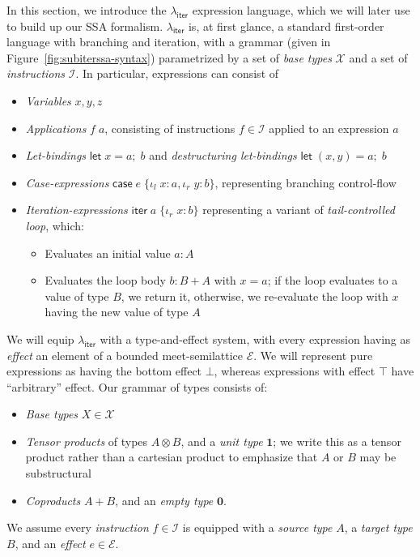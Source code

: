 \documentclass[acmsmall,screen,review]{acmart}
\newcommand{\mc}[1]{\ensuremath{\mathcal{#1}}}
\newcommand{\mb}[1]{\ensuremath{\mathbf{#1}}}
\newcommand{\ms}[1]{\ensuremath{\mathsf{#1}}}
\newcommand{\lto}{:}
\newcommand{\linl}[1]{\iota_l\;{#1}}
\newcommand{\linr}[1]{\iota_r\;{#1}}
\newcommand{\letexpr}[3]{\ensuremath{\ms{let}\;#1 = #2;\;#3}}
\newcommand{\caseexpr}[5]{\ms{case}\;#1\;\{\linl{#2} \lto #3, \linr{#4} \lto #5\}}
\newcommand{\liter}[3]{\ms{iter}\;#1\;\{ \linr{#2} \lto #3 \}}
\newcommand{\subiterssa}{\(\lambda_{\ms{iter}}\)}
\begin{document}
In this section, we introduce the \subiterssa{} expression language, which we will later use to
build up our SSA formalism. \subiterssa{} is, at first glance, a standard first-order language with
branching and iteration, with a grammar (given in Figure~\ref{fig:subiterssa-syntax})  parametrized
by a set of \emph{base types} $\mc{X}$ and a set of \emph{instructions} $\mc{I}$. In particular,
expressions can consist of
\begin{itemize}
  \item \emph{Variables} $x, y, z$
  \item \emph{Applications} $f\;a$, consisting of instructions $f \in \mc{I}$ applied to an
  expression $a$
  \item \emph{Let-bindings} $\letexpr{x}{a}{b}$ and \emph{destructuring let-bindings} $\letexpr{(x,
  y)}{a}{b}$
  \item \emph{Case-expressions} $\caseexpr{e}{x}{a}{y}{b}$, representing branching control-flow
  \item \emph{Iteration-expressions} $\liter{a}{x}{b}$ representing a variant of
  \emph{tail-controlled loop}, which:
  \begin{itemize}
    \item Evaluates an initial value $a : A$
    \item Evaluates the loop body $b : B + A$ with $x = a$; if the loop evaluates to a value of type
    $B$, we return it, otherwise, we re-evaluate the loop with $x$ having the new value of type $A$
  \end{itemize}
\end{itemize}
We will equip \subiterssa{} with a type-and-effect system, with every expression having as
\emph{effect} an element of a bounded meet-semilattice $\mc{E}$. We will represent pure expressions
as having the bottom effect $\bot$, whereas expressions with effect $\top$ have ``arbitrary''
effect. Our grammar of types consists of:
\begin{itemize}
  \item \emph{Base types} $X \in \mc{X}$
  \item \emph{Tensor products} of types $A \otimes B$, and a \emph{unit type} $\mb{1}$; we write
  this as a tensor product rather than a cartesian product to emphasize that $A$ or $B$ may be
  substructural
  \item \emph{Coproducts} $A + B$, and an \emph{empty type} $\mb{0}$.
\end{itemize}
We assume every \emph{instruction} $f \in \mc{I}$ is equipped with a \emph{source type} $A$, a
\emph{target type} $B$, and an \emph{effect} $e \in \mc{E}$.
\end{document}
